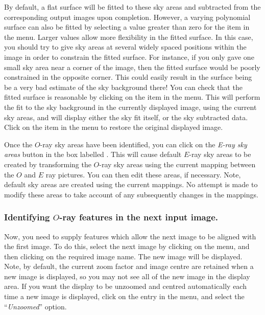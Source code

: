 By default, a flat surface will be fitted to these sky areas and
subtracted from the corresponding output images upon completion. However,
a varying polynomial surface can also be fitted by selecting a value
greater than zero for the  item
in the  menu. Larger values
allow more flexibility in the fitted surface. In this case, you should
try to give sky areas at several widely spaced positions within the image
in order to constrain the fitted surface. For instance, if you only gave
one small sky area near a corner of the image, then the fitted surface
would be poorly constrained in the opposite corner. This could easily
result in the surface being be a very bad estimate of the sky background
there! You can check that the fitted surface is reasonable by clicking on
the  item in the
 menu. This will perform
the fit to the sky background in the currently displayed image, using the
current sky areas, and will display either the sky fit itself, or the sky
subtracted data. Click on the 
 item in the 
 menu to restore the original
displayed image.

Once the $O$-ray sky areas have been identified, you can click on the
{\em E-ray sky areas} button in the box labelled . This will cause default $E$-ray sky areas to
be created by transforming the $O$-ray sky areas using the current
mapping between the $O$ and $E$ ray pictures. You can then edit these
areas, if necessary. Note, default sky areas are created using the
current mappings. No attempt is made to modify these areas to take
account of any subsequently changes in the mappings.

\subsubsection {Identifying $O$-ray features in the next input image.}
Now, you need to supply features which allow the next image to be
aligned with the first image. To do this, select the next image by
clicking on the  menu, and then
clicking on the required image name. The new image will be displayed.
Note, by default, the current zoom factor and image centre are retained
when a new image is displayed, so you may not see all of the new image in
the display area. If you want the display to be unzoomed and centred
automatically each time a new image is displayed, click on the
 entry in the  menu, and select the ``{\em Unzoomed}'' option.

